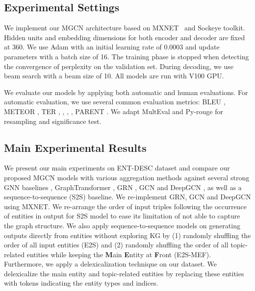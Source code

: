 \documentclass[11pt,a4paper]{article}
\begin{document}
\subsection{Experimental Settings}
We implement our MGCN architecture based on MXNET~\cite{chen2015mxnet} and Sockeye toolkit.
Hidden units and embedding dimensions for both encoder and decoder are fixed at 360. 
We use Adam \cite{kingma2014adam} with an initial learning rate of 0.0003 and update parameters with a batch size of 16. 
The training phase is stopped when detecting the convergence of perplexity on the validation set.
During decoding, we use beam search with a beam size of 10.
All models are run with V100 GPU.


We evaluate our models by applying both automatic and human evaluations.
For automatic evaluation, we use several common evaluation metrics: BLEU \cite{papineni2002bleu}, 
METEOR \cite{denkowski2011meteor}, TER \cite{snover2006study}, , ,  \cite{lin2004rouge}, PARENT \cite{dhingra2019handling}. We adapt MultEval \cite{clark2011better} and Py-rouge for resampling and significance test.








\subsection{Main Experimental Results}
We present our main experiments on ENT-DESC dataset and compare our proposed MGCN models with various aggregation methods against several strong GNN baselines \cite{bahdanau2014neural},  
GraphTransformer \cite{koncel2019text}, GRN \cite{beck2018graph}, GCN \cite{marcheggiani2018deep} and DeepGCN \cite{guo2019densely}, as well as a sequence-to-sequence (S2S) baseline.
We re-implement GRN, GCN and DeepGCN using MXNET.
We re-arrange the order of input triples following the occurrence of entities in output for S2S model to ease its limitation of not able to capture the graph structure.
We also apply sequence-to-sequence models on generating outputs directly from entities without exploring KG by (1) randomly shuffling the order of all input entities (E2S) and (2) randomly shuffling the order of all topic-related entities while keeping the \textbf{M}ain \textbf{E}ntity at \textbf{F}ront (E2S-MEF).
Furthermore, we apply a delexicalization technique on our dataset.
We delexicalize the main entity and topic-related entities by replacing these entities with tokens indicating the entity types and indices. 
\end{document}
